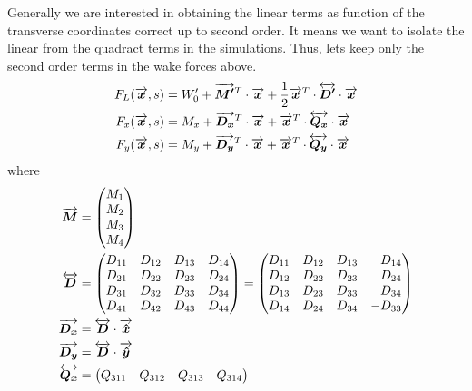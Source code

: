 \begin{apendicesenv}
    Generally we are interested in obtaining the linear terms as function of the transverse coordinates correct up to second order. It means we want to isolate the linear from the quadract terms in the simulations. Thus, lets keep only the second order terms in the wake forces above.
    \begin{align}
		F_L(\overrightarrow{\boldsymbol{x}},s) &= W_0' + \overrightarrow{\boldsymbol{M'}}^T \cdot \overrightarrow{\boldsymbol{x}} + \frac12\overrightarrow{\boldsymbol{x}}^T \cdot \overleftrightarrow{\boldsymbol{D'}}  \cdot \overrightarrow{\boldsymbol{x}} \\
		F_x(\overrightarrow{\boldsymbol{x}},s) &= M_x + \overrightarrow{\boldsymbol{D_x}}^T \cdot \overrightarrow{\boldsymbol{x}} +        \overrightarrow{\boldsymbol{x}}^T \cdot \overleftrightarrow{\boldsymbol{Q_x}} \cdot \overrightarrow{\boldsymbol{x}} \\
		F_y(\overrightarrow{\boldsymbol{x}},s) &= M_y + \overrightarrow{\boldsymbol{D_y}}^T \cdot \overrightarrow{\boldsymbol{x}} +        \overrightarrow{\boldsymbol{x}}^T \cdot \overleftrightarrow{\boldsymbol{Q_y}} \cdot \overrightarrow{\boldsymbol{x}}
    \end{align}
    where
    \begin{align}
		\vect{M} &= \begin{pmatrix*}[r] M_{1}\\ M_{2}\\ M_{3}\\ M_{4}\end{pmatrix*} \\
		\tensor{D}  &= \begin{pmatrix*}[r] D_{11} & D_{12} & D_{13} & D_{14} \\
                                   D_{21} & D_{22} & D_{23} & D_{24} \\
                                   D_{31} & D_{32} & D_{33} & D_{34} \\
                                   D_{41} & D_{42} & D_{43} & D_{44}
               \end{pmatrix*} =
               \begin{pmatrix*}[r] D_{11} & D_{12} & D_{13} & D_{14} \\
                                   D_{12} & D_{22} & D_{23} & D_{24} \\
                                   D_{13} & D_{23} & D_{33} & D_{34} \\
                                   D_{14} & D_{24} & D_{34} & -D_{33}
               \end{pmatrix*}\\
		\vect{D_x} &= \tensor{D}\cdot \vect{\hat{x}} \\
		\vect{D_y} &= \tensor{D}\cdot \vect{\hat{y}} \\
		\tensor{Q_x}&= \begin{pmatrix*}[r] Q_{311} & Q_{312} & Q_{313} & Q_{314} \\

\end{pmatrix*}
\end{align}
\end{apendicesenv}
